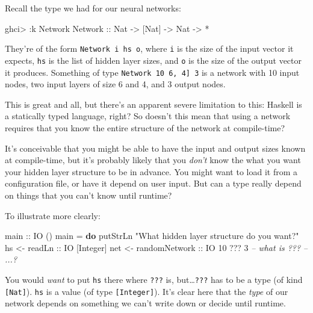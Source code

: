 \documentclass[]{article}
\newenvironment{Shaded}{}{}
\newcommand{\KeywordTok}[1]{\textcolor[rgb]{0.00,0.44,0.13}{\textbf{{#1}}}}
\newcommand{\DataTypeTok}[1]{\textcolor[rgb]{0.56,0.13,0.00}{{#1}}}
\newcommand{\DecValTok}[1]{\textcolor[rgb]{0.25,0.63,0.44}{{#1}}}
\newcommand{\StringTok}[1]{\textcolor[rgb]{0.25,0.44,0.63}{{#1}}}
\newcommand{\CommentTok}[1]{\textcolor[rgb]{0.38,0.63,0.69}{\textit{{#1}}}}
\newcommand{\OtherTok}[1]{\textcolor[rgb]{0.00,0.44,0.13}{{#1}}}
\newcommand{\FunctionTok}[1]{\textcolor[rgb]{0.02,0.16,0.49}{{#1}}}
\newcommand{\NormalTok}[1]{{#1}}
\begin{document}
Recall the type we had for our neural networks:

\begin{Shaded}
\begin{Highlighting}[]
\NormalTok{ghci}\FunctionTok{>} \FunctionTok{:}\NormalTok{k }\DataTypeTok{Network}
\DataTypeTok{Network}\OtherTok{ ::} \DataTypeTok{Nat} \OtherTok{->} \NormalTok{[}\DataTypeTok{Nat}\NormalTok{] }\OtherTok{->} \DataTypeTok{Nat} \OtherTok{->} \FunctionTok{*}
\end{Highlighting}
\end{Shaded}

They're of the form \texttt{Network\ i\ hs\ o}, where \texttt{i} is the size of
the input vector it expects, \texttt{hs} is the list of hidden layer sizes, and
\texttt{o} is the size of the output vector it produces. Something of type
\texttt{Network\ 10\ \textquotesingle{}{[}6,\ 4{]}\ 3} is a network with 10
input nodes, two input layers of size 6 and 4, and 3 output nodes.

This is great and all, but there's an apparent severe limitation to this:
Haskell is a statically typed language, right? So doesn't this mean that using a
network requires that you know the entire structure of the network at
compile-time?

It's conceivable that you might be able to have the input and output sizes known
at compile-time, but it's probably likely that you \emph{don't} know the what
you want your hidden layer structure to be in advance. You might want to load it
from a configuration file, or have it depend on user input. But can a type
really depend on things that you can't know until runtime?

To illustrate more clearly:

\begin{Shaded}
\begin{Highlighting}[]
\OtherTok{main ::} \DataTypeTok{IO} \NormalTok{()}
\NormalTok{main }\FunctionTok{=} \KeywordTok{do}
    \NormalTok{putStrLn }\StringTok{"What hidden layer structure do you want?"}
    \NormalTok{hs  }\OtherTok{<- readLn        ::} \DataTypeTok{IO} \NormalTok{[}\DataTypeTok{Integer}\NormalTok{]}
    \NormalTok{net }\OtherTok{<- randomNetwork ::} \DataTypeTok{IO} \DecValTok{10} \FunctionTok{???} \DecValTok{3}   \CommentTok{-- what is ???}
    \CommentTok{-- ...?}
\end{Highlighting}
\end{Shaded}

You would \emph{want} to put \texttt{hs} there where \texttt{???} is,
but\ldots{}\texttt{???} has to be a type (of kind \texttt{{[}Nat{]}}).
\texttt{hs} is a value (of type \texttt{{[}Integer{]}}). It's clear here that
the \emph{type} of our network depends on something we can't write down or
decide until runtime.
\end{document}
